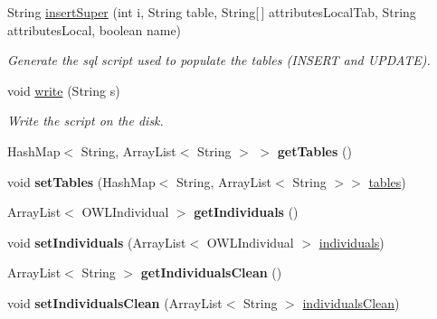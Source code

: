\begin{DoxyCompactItemize}
String \hyperlink{class_data_base_1_1_individuals_a0699518228103b4a15b5216cf1b6fc1c}{insertSuper} (int i, String table, String\mbox{[}$\,$\mbox{]} attributesLocalTab, String attributesLocal, boolean name)
\begin{DoxyCompactList}\small\item\em Generate the sql script used to populate the tables (INSERT and UPDATE).\end{DoxyCompactList}\item 
void \hyperlink{class_data_base_1_1_individuals_ac2bdba826ce8df48d9a01ba5fe0f4291}{write} (String s)
\begin{DoxyCompactList}\small\item\em Write the script on the disk. \end{DoxyCompactList}\item 
\hypertarget{class_data_base_1_1_individuals_a2774244bf7f4184092f16df48f881d8b}{
HashMap$<$ String, ArrayList$<$ String $>$ $>$ {\bfseries getTables} ()}
\label{class_data_base_1_1_individuals_a2774244bf7f4184092f16df48f881d8b}

\item 
\hypertarget{class_data_base_1_1_individuals_a02ef08587b5dc8a30069efeb3d716e87}{
void {\bfseries setTables} (HashMap$<$ String, ArrayList$<$ String $>$$>$ \hyperlink{class_data_base_1_1_individuals_ae6a515b85461d50ad21ac1051c5133b1}{tables})}
\label{class_data_base_1_1_individuals_a02ef08587b5dc8a30069efeb3d716e87}

\item 
\hypertarget{class_data_base_1_1_individuals_ad1f009e87c04b913a721481baa9ae6d4}{
ArrayList$<$ OWLIndividual $>$ {\bfseries getIndividuals} ()}
\label{class_data_base_1_1_individuals_ad1f009e87c04b913a721481baa9ae6d4}

\item 
\hypertarget{class_data_base_1_1_individuals_a49267b47171258c37405a0e6dfa98e61}{
void {\bfseries setIndividuals} (ArrayList$<$ OWLIndividual $>$ \hyperlink{class_data_base_1_1_individuals_a08ea25eeecb245fe06a36c95be656b3f}{individuals})}
\label{class_data_base_1_1_individuals_a49267b47171258c37405a0e6dfa98e61}

\item 
\hypertarget{class_data_base_1_1_individuals_a7130376df06f7d960915d20d45cf2393}{
ArrayList$<$ String $>$ {\bfseries getIndividualsClean} ()}
\label{class_data_base_1_1_individuals_a7130376df06f7d960915d20d45cf2393}

\item 
\hypertarget{class_data_base_1_1_individuals_a4f6e0a7d92c028c407543a5e4cacc029}{
void {\bfseries setIndividualsClean} (ArrayList$<$ String $>$ \hyperlink{class_data_base_1_1_individuals_ae24686ef4531cd049c7a673911388cab}{individualsClean})}
\label{class_data_base_1_1_individuals_a4f6e0a7d92c028c407543a5e4cacc029}


\end{DoxyCompactItemize}

